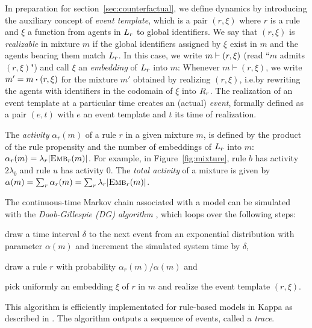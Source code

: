 

In preparation for section~\ref{sec:counterfactual}, we define dynamics by
introducing the auxiliary concept of \emph{event template}, which is a pair $(r,
\xi)$ where $r$ is a rule and $\xi$ a function
from agents in $L_{r}$ to global identifiers. We say that
$(r, \xi)$ is \emph{realizable} in mixture $m$ if the global
identifiers assigned by $\xi$ exist in $m$ and the agents bearing them
match $L_{r}$. In this case, we write $m \vdash (r, \xi)$
(read ``$m$ admits $(r, \xi)$") and call $\xi$ an
\emph{embedding} of $L_{r}$ into $m$:
Whenever $m \vdash (r, \xi)$, we write $m'=\UPDATE{m}{(r, \xi)}$ for
the mixture $m'$ obtained by realizing $(r, \xi)$, i.e.\@ by rewriting
the agents with identifiers in the codomain of $\xi$ into $R_{r}$. The
realization of an event template at a particular time creates an (actual) \emph{event}, formally defined as a pair $(e, t)$ with $e$ an event template and $t$ its time of realization. 

The \emph{activity} $\alpha_r(m)$ of a rule $r$ in a given mixture $m$,
is defined by the product of the rule propensity and the number of
embeddings of $L_{r}$ into $m$:
$\alpha_r(m)=\lambda_r|{\textsc{Emb}}_{r}(m)|$. For example, in
Figure~\ref{fig:mixture}, rule $b$ has activity $2\lambda_b$ and rule
$u$ has activity $0$. The \emph{total activity} of a mixture is given
by $\alpha(m)=\sum_r\alpha_r(m)=\sum_r\lambda_r|{\textsc{Emb}}_{r}(m)|$.

The continuous-time Markov chain associated with a model can be
simulated with the \emph{Doob-Gillespie (DG) algorithm}
\cite{gillespie1977exact}, which loops over the
following steps:
\begin{inparaenum}[(1)]
\item draw a time interval $\delta$ to the next event from an
  exponential distribution with parameter $\alpha(m)$ and increment
  the simulated system time by $\delta$,
\item draw a rule $r$ with probability $\alpha_r(m)/\alpha(m)$ and
\item pick uniformly an embedding $\xi$ of $r$ in $m$ and realize the
 event template $(r, \xi)$.
\end{inparaenum}
This algorithm is efficiently implementated for rule-based
models in Kappa as described in
\cite{DanosEtAl-APLAS07,BoutillierEK17}. The algorithm outputs a sequence of
events, called a \emph{trace}.

